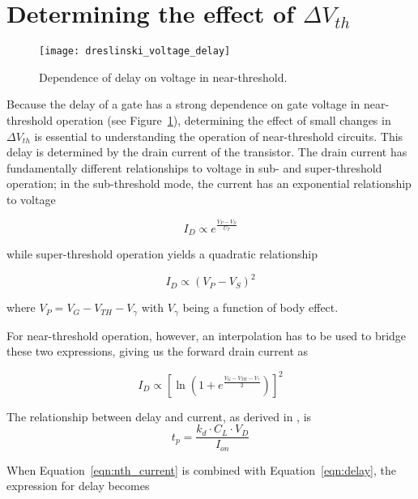 \section{Determining the effect of $\Delta V_{th}$}
\label{sec:deltavth}

\begin{figure}[thpb]
    \centering
    \texttt{[image: dreslinski\_voltage\_delay]}
    \caption{Dependence of delay on voltage in near-threshold.~\cite{Dreslinski:2010ez}}
    \label{fig:voltage_delay}
\end{figure}
Because the delay of a gate has a strong dependence on gate voltage in near-threshold operation (see Figure~\ref{fig:voltage_delay}), determining the effect of small changes in $\Delta V_{th}$ is essential to understanding the operation of near-threshold circuits.
This delay is determined by the drain current of the transistor.
The drain current has fundamentally different relationships to voltage in sub- and super-threshold operation; in the sub-threshold mode, the current has an exponential relationship to voltage~\cite{Enz:1995vs} 

\begin{equation}
I_D \propto e^\frac{V_P-V_S}{U_T}
\end{equation}

while super-threshold operation yields a quadratic relationship

\begin{equation}
I_D \propto (V_P-V_S)^2
\end{equation}

where $V_P=V_G-V_{TH}-V_\gamma$ with $V_\gamma$ being a function of body effect.

For near-threshold operation, however, an interpolation has to be used to bridge these two expressions\cite{Enz:1995vs}, giving us the forward drain current as

\begin{equation}
\label{eqn:nth_current}
I_D \propto \left[\ln\left(1+e^\frac{V_G-V_{TH}-V_\gamma}{2}\right)\right]^2
\end{equation}

The relationship between delay and current, as derived in \cite{Hanson:2007uu}, is
\begin{equation}
\label{eqn:delay}
t_p = \frac{k_d\cdot C_L\cdot V_D}{I_{on}}
\end{equation}

When Equation~\ref{eqn:nth_current} is combined with Equation~\ref{eqn:delay}, the expression for delay becomes

